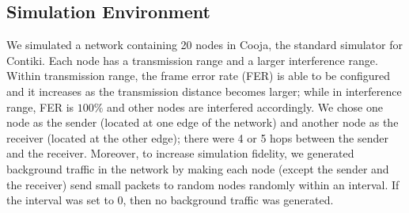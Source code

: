 \documentclass[runningheads,a4paper]{llncs}
\begin{document}
\subsection{Simulation Environment}
We simulated a network containing 20 nodes in Cooja, the standard simulator for Contiki. Each node has a transmission range and a larger interference range. Within transmission range, the frame error rate (FER) is able to be configured and it increases as the transmission distance becomes larger; while in interference range, FER is $100\%$ and other nodes are interfered accordingly. We chose one node as the sender (located at one edge of the network) and another node as the receiver (located at the other edge); there were 4 or 5 hops between the sender and the receiver. Moreover, to increase simulation fidelity, we generated background traffic in the network by making each node (except the sender and the receiver) send small packets to random nodes randomly within an interval. If the interval was set to 0, then no background traffic was generated.
\end{document}
